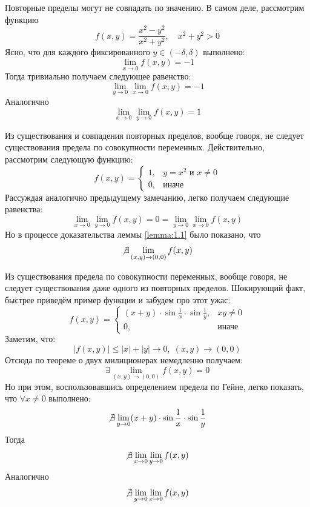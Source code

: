 \documentclass[11pt]{article}
\begin{document}
\begin{remark}
    Повторные пределы могут не совпадать по значению. В самом деле, рассмотрим функцию 
    \[f(x, y) = \frac{x^2 - y^2}{x^2 + y^2}, \quad x^2 + y^2 > 0\]
    Ясно, что для каждого фиксированного $y \in (-\delta, \delta)$ выполнено:
    \[\lim_{x \to 0} f(x, y) = -1\]
    Тогда тривиально получаем следующее равенство:
    \[\lim_{y \to 0} \lim_{x \to 0} f(x, y) = -1\]
    Аналогично
    \[\lim_{x \to 0} \lim_{y \to 0} f(x, y) = 1\]
\end{remark}

\begin{remark}
    Из существования и совпадения повторных пределов, вообще говоря, не следует существования 
    предела по совокупности переменных. Действительно, рассмотрим следующую функцию:
    \begin{equation*}
        f(x, y) = 
        \begin{cases}
            1, & y = x^2 \text{ и } x \neq 0 \\
            0, & \text{иначе}
        \end{cases}
    \end{equation*}
    Рассуждая аналогично предыдущему замечанию, легко получаем следующие равенства:
    \[\lim_{x \to 0} \lim_{y \to 0} f(x, y) = 0 = \lim_{y \to 0} \lim_{x \to 0} f(x, y)\]
    Но в процессе доказательства леммы \ref{lemma:1.1} было показано, что 
    \[\not \exists \lim_{(x, y) \to (0, 0)} f(x, y)\]
\end{remark}

\begin{remark}
    Из существования предела по совокупности переменных, вообще говоря, не следует существования 
    даже одного из повторных пределов. Шокирующий факт, быстрее приведём пример функции и забудем про этот ужас:
    \begin{equation*}
        f(x, y) = 
        \begin{cases}
            (x + y) \cdot \sin \frac{1}{x} \cdot \sin \frac{1}{y}, & xy \neq 0 \\
            0, & \text{иначе}
        \end{cases}
    \end{equation*}
    Заметим, что:
    \[\left\lvert f(x, y) \right\rvert \leq \left\lvert x \right\rvert + \left\lvert y \right\rvert \to 0, \; (x, y) \to (0, 0)\]
    Отсюда по теореме о двух милиционерах немедленно получаем:
    \[\exists \lim_{(x, y) \to (0, 0)} f(x, y) = 0\]
    Но при этом, воспользовавшись определением предела по Гейне, легко показать, что $\forall x \neq 0$ выполнено:
    \[\not \exists \lim_{y \to 0} (x + y) \cdot \sin \frac{1}{x} \cdot \sin \frac{1}{y}\]
    Тогда
    \[\not \exists \lim_{x \to 0} \lim_{y \to 0} f(x, y)\]
    Аналогично
    \[\not \exists \lim_{y \to 0} \lim_{x \to 0} f(x, y)\]
\end{remark}
\end{document}
